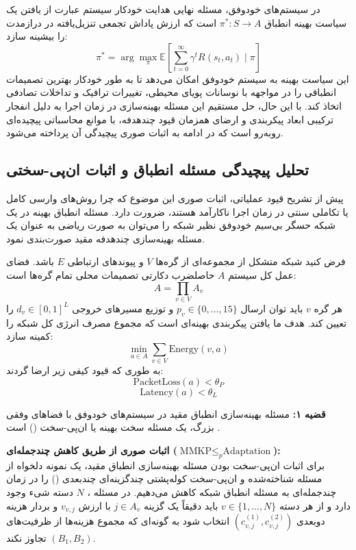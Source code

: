 \documentclass[oneside,openany,phd]{TMU-Thesis}
\begin{document}
در سیستم‌های خودوفق، مسئله نهایی هدایت خودکار سیستم عبارت از یافتن یک سیاست بهینه انطباق $\pi^*: S \rightarrow A$ است که ارزش پاداش تجمعی تنزیل‌یافته در درازمدت را بیشینه سازد:
$$\pi^* = \arg\max_{\pi} \mathbb{E}\left[\sum_{t=0}^{\infty} \gamma^t R(s_t, a_t) \mid \pi\right]$$
این سیاست بهینه به سیستم خودوفق امکان می‌دهد تا به طور خودکار بهترین تصمیمات انطباقی را در مواجهه با نوسانات پویای محیطی، تغییرات ترافیک و تداخلات تصادفی اتخاذ کند. با این حال، حل مستقیم این مسئله بهینه‌سازی در زمان اجرا به دلیل انفجار ترکیبی ابعاد پیکربندی و ارضای همزمان قیود چندهدفه، با موانع محاسباتی پیچیده‌ای روبه‌رو است که در ادامه به اثبات صوری پیچیدگی آن پرداخته می‌شود.

\subsection{تحلیل پیچیدگی مسئله انطباق و اثبات ان‌پی-سختی}
\label{subsec:np_hard_proof}

پیش از تشریح قیود عملیاتی، اثبات صوری این موضوع که چرا روش‌های وارسی کامل یا تکاملی سنتی در زمان اجرا ناکارآمد هستند، ضرورت دارد. مسئله انطباق بهینه در یک شبکه حسگر بی‌سیم خودوفق نظیر شبکه  را می‌توان به صورت ریاضی به عنوان یک مسئله بهینه‌سازی چندهدفه مقید صورت‌بندی نمود.

فرض کنید شبکه متشکل از مجموعه‌ای از گره‌ها $V$ و پیوندهای ارتباطی $E$ باشد. فضای عمل کل سیستم $A$ حاصلضرب دکارتی تصمیمات محلی تمام گره‌ها است:
$$A = \prod_{v \in V} A_v$$
هر گره $v$ باید توان ارسال $p_v \in \{0, \ldots, 15\}$ و توزیع مسیرهای خروجی $d_v \in [0, 1]^L$ را تعیین کند. هدف ما یافتن پیکربندی بهینه‌ای است که مجموع مصرف انرژی کل شبکه را کمینه سازد:
$$\min_{a \in A} \sum_{v \in V} \text{Energy}(v, a)$$
به طوری که قیود کیفی زیر ارضا گردند:
$$\text{PacketLoss}(a) < \theta_P$$
$$\text{Latency}(a) < \theta_L$$

\textbf{قضیه ۱:} مسئله بهینه‌سازی انطباق مقید در سیستم‌های خودوفق با فضاهای وفقی بزرگ، یک مسئله سخت بهینه یا ان‌پی-سخت () است \cite{garey1979computers}.

\textbf{اثبات صوری از طریق کاهش چندجمله‌ای ($\text{MMKP} \le_p \text{Adaptation}$):} \\
برای اثبات ان‌پی-سخت بودن مسئله بهینه‌سازی انطباق مقید، یک نمونه دلخواه از مسئله شناخته‌شده و ان‌پی-سخت کوله‌پشتی چندگزینه‌ای چندبعدی () \cite{garey1979computers} را در زمان چندجمله‌ای به مسئله انطباق شبکه  کاهش می‌دهیم. در مسئله ، $N$ دسته شیء وجود دارد و از هر دسته $v \in \{1, \ldots, N\}$ باید دقیقاً یک گزینه $j \in A_v$ با ارزش $v_{v,j}$ و بردار هزینه دو‌بعدی $(c^{(1)}_{v,j}, c^{(2)}_{v,j})$ انتخاب شود به گونه‌ای که مجموع هزینه‌ها از ظرفیت‌های $(B_1, B_2)$ تجاوز نکند.
\end{document}
